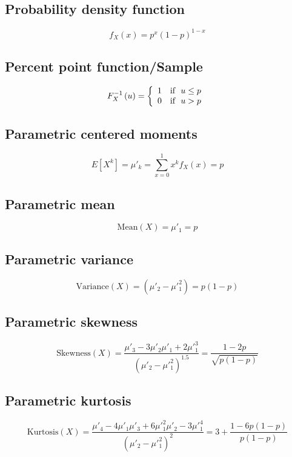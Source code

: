 \documentclass{article}
\begin{document}
\subsection{Probability density function}
\begin{equation*} f_{X}\left(x\right)=p^x(1-p)^{1-x} \end{equation*}
\subsection{Percent point function/Sample}
\begin{equation*} F^{-1}_{X}\left(u\right)=\left\{\begin{array}{cl} 1 & \text{if } \ u \leq p \\ 0 & \text{if } \ u > p \end{array} \right.\\ \end{equation*}
\subsection{Parametric centered moments}
\begin{equation*} E[X^k]=\mu'_{k}=\sum_{x=0}^{1}x^{k}f_{X}\left(x\right)=p \end{equation*}
\subsection{Parametric mean}
\begin{equation*} \mathrm{Mean}(X)=\mu'_{1}=p \end{equation*}
\subsection{Parametric variance}
\begin{equation*} \mathrm{Variance}(X)=(\mu'_{2}-\mu'^{2}_{1})=p(1-p) \end{equation*}
\subsection{Parametric skewness}
\begin{equation*} \mathrm{Skewness}(X)=\frac{\mu'_{3}-3\mu'_{2}\mu'_{1}+2\mu'^{3}_{1}}{(\mu'_{2}-\mu'^{2}_{1})^{1.5}}=\frac{1-2p}{\sqrt{p(1-p)}} \end{equation*}
\subsection{Parametric kurtosis}
\begin{equation*} \mathrm{Kurtosis}(X)=\frac{\mu'_{4}-4\mu'_{1}\mu'_{3}+6\mu'^{2}_{1}\mu'_{2}-3\mu'^{4}_{1}}{(\mu'_{2}-\mu'^{2}_{1})^{2}}=3+\frac{1 - 6p(1-p)}{p(1-p)} \end{equation*}
\end{document}
